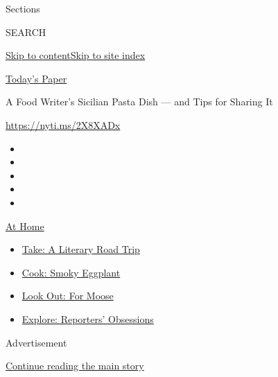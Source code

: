Sections

SEARCH

\protect\hyperlink{site-content}{Skip to
content}\protect\hyperlink{site-index}{Skip to site index}

\href{https://myaccount.nytimes3xbfgragh.onion/auth/login?response_type=cookie\&client_id=vi}{}

\href{https://www.nytimes3xbfgragh.onion/section/todayspaper}{Today's
Paper}

A Food Writer's Sicilian Pasta Dish --- and Tips for Sharing It

\url{https://nyti.ms/2X8XADx}

\begin{itemize}
\item
\item
\item
\item
\item
\end{itemize}

\href{https://www.nytimes3xbfgragh.onion/spotlight/at-home?action=click\&pgtype=Article\&state=default\&region=TOP_BANNER\&context=at_home_menu}{At
Home}

\begin{itemize}
\tightlist
\item
  \href{https://www.nytimes3xbfgragh.onion/2020/07/28/books/time-for-a-literary-road-trip.html?action=click\&pgtype=Article\&state=default\&region=TOP_BANNER\&context=at_home_menu}{Take:
  A Literary Road Trip}
\item
  \href{https://www.nytimes3xbfgragh.onion/2020/07/29/magazine/bored-with-your-home-cooking-some-smoky-eggplant-will-fix-that.html?action=click\&pgtype=Article\&state=default\&region=TOP_BANNER\&context=at_home_menu}{Cook:
  Smoky Eggplant}
\item
  \href{https://www.nytimes3xbfgragh.onion/2020/07/27/travel/moose-michigan-isle-royale.html?action=click\&pgtype=Article\&state=default\&region=TOP_BANNER\&context=at_home_menu}{Look
  Out: For Moose}
\item
  \href{https://www.nytimes3xbfgragh.onion/interactive/2020/at-home/even-more-reporters-editors-diaries-lists-recommendations.html?action=click\&pgtype=Article\&state=default\&region=TOP_BANNER\&context=at_home_menu}{Explore:
  Reporters' Obsessions}
\end{itemize}

Advertisement

\protect\hyperlink{after-top}{Continue reading the main story}


